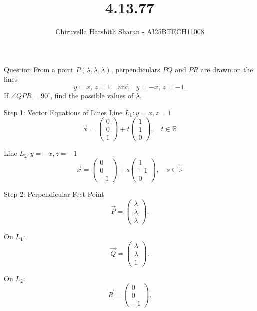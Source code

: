 \documentclass{beamer}
\title{4.13.77}
\author{Chiruvella Harshith Sharan - AI25BTECH11008}
\begin{document}
\frame{\titlepage}


\begin{frame}{Question}
From a point $P(\lambda,\lambda,\lambda)$, perpendiculars $PQ$ and $PR$ are drawn 
on the lines 
\[
y=x, \, z=1 \quad \text{and} \quad y=-x, \, z=-1.
\]
If $\angle QPR = 90^\circ$, find the possible values of $\lambda$.
\end{frame}


\begin{frame}{Step 1: Vector Equations of Lines}
Line $L_1: y=x, z=1$
\[
\vec{x} = \begin{pmatrix}0\\0\\1\end{pmatrix} + t\begin{pmatrix}1\\1\\0\end{pmatrix}, \quad t\in\mathbb{R} \tag{1}
\]

Line $L_2: y=-x, z=-1$
\[
\vec{x} = \begin{pmatrix}0\\0\\-1\end{pmatrix} + s\begin{pmatrix}1\\-1\\0\end{pmatrix}, \quad s\in\mathbb{R} \tag{2}
\]
\end{frame}


\begin{frame}{Step 2: Perpendicular Feet}
Point 
\[
\vec{P} = \begin{pmatrix}\lambda\\\lambda\\\lambda\end{pmatrix}.
\]

On $L_1$: 
\[
\vec{Q} = \begin{pmatrix}\lambda\\\lambda\\1\end{pmatrix}. \tag{3}
\]

On $L_2$: 
\[
\vec{R} = \begin{pmatrix}0\\0\\-1\end{pmatrix}. \tag{4}
\]
\end{frame}
\end{document}
